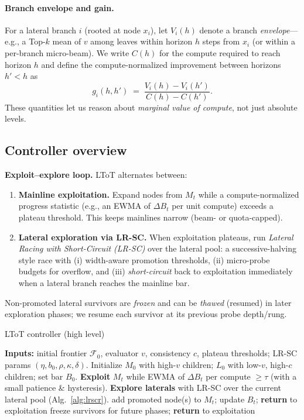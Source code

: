 \documentclass{article}
\begin{document}
\paragraph{Branch envelope and gain.}
For a lateral branch $i$ (rooted at node $x_i$), let $V_i(h)$ denote a branch \emph{envelope}—e.g., a Top-$k$ mean of $v$ among leaves within horizon $h$ steps from $x_i$ (or within a per-branch micro-beam). We write $C(h)$ for the compute required to reach horizon $h$ and define the compute-normalized improvement between horizons $h'<h$ as
\[
g_i(h,h') \;=\; \frac{V_i(h)-V_i(h')}{C(h)-C(h')}.
\]
These quantities let us reason about \emph{marginal value of compute}, not just absolute levels.

\vspace{0.5em}
\subsection{Controller overview}
\label{sec:controller}

\textbf{Exploit--explore loop.}
LToT alternates between:
\begin{enumerate}
    \item \textbf{Mainline exploitation.} Expand nodes from $M_t$ while a compute-normalized progress statistic (e.g., an EWMA of $\Delta B_t$ per unit compute) exceeds a plateau threshold. This keeps mainlines narrow (beam- or quota-capped).
    \item \textbf{Lateral exploration via LR-SC.} When exploitation plateaus, run \emph{Lateral Racing with Short-Circuit (LR-SC)} over the lateral pool: a successive-halving style race with (i) width-aware promotion thresholds, (ii) micro-probe budgets for overflow, and (iii) \emph{short-circuit} back to exploitation immediately when a lateral branch reaches the mainline bar.
\end{enumerate}
Non-promoted lateral survivors are \emph{frozen} and can be \emph{thawed} (resumed) in later exploration phases; we resume each survivor at its previous probe depth/rung.

\begin{algorithm}[t]
\caption{LToT controller (high level)}
\label{alg:ltot-controller}
\begin{algorithmic}[1]
\State \textbf{Inputs:} initial frontier $\mathcal{F}_0$, evaluator $v$, consistency $c$, plateau thresholds; LR-SC params $(\eta,b_0,\rho, \kappa,\delta)$.
\State Initialize $M_0$ with high-$v$ children; $L_0$ with low-$v$, high-$c$ children; set bar $B_0$.
  \State \textbf{Exploit} $M_t$ while EWMA of $\Delta B_t$ per compute $\ge \tau$ (with a small patience \& hysteresis).
  \State \textbf{Explore laterals} with LR-SC over the current lateral pool (Alg.~\ref{alg:lrscr}). \label{line:lrscr}
     \State add promoted node(s) to $M_t$; update $B_t$; \textbf{return} to exploitation
  \Else
     \State freeze survivors for future phases; \textbf{return} to exploitation
  \EndIf
\EndWhile
\end{algorithmic}
\end{algorithm}
\end{document}
